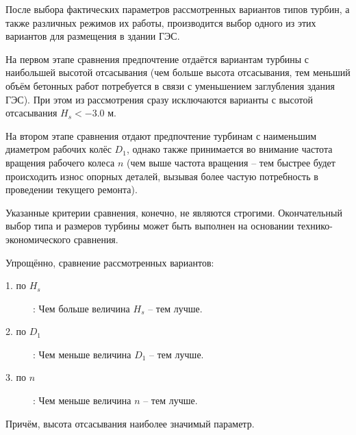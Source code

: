 После выбора фактических параметров рассмотренных вариантов типов турбин, а также различных режимов их работы, производится выбор одного из этих вариантов для размещения в здании ГЭС.

На первом этапе сравнения предпочтение отдаётся вариантам турбины с наибольшей высотой отсасывания (чем больше высота отсасывания, тем меньший объём бетонных работ потребуется в связи с уменьшением заглубления здания ГЭС). При этом из рассмотрения сразу исключаются варианты с высотой отсасывания $H_s < -3.0$ м.

На втором этапе сравнения отдают предпочтение турбинам с наименьшим диаметром рабочих колёс $D_1$, однако также принимается во внимание частота вращения рабочего колеса $n$ (чем выше частота вращения -- тем быстрее будет происходить износ опорных деталей, вызывая более частую потребность в проведении текущего ремонта).

Указанные критерии сравнения, конечно, не являются строгими. Окончательный выбор типа и размеров турбины может быть выполнен на основании технико-экономического сравнения.

\vspace{0.5cm}

Упрощённо, сравнение рассмотренных вариантов:

\begin{description}
\item[1. по $H_s$]: Чем больше величина $H_s$ -- тем лучше. 
\item[2. по $D_1$]: Чем меньше величина $D_1$ -- тем лучше.
\item[3. по $n$]: Чем меньше величина $n$ -- тем лучше.
\end{description}

Причём, высота отсасывания наиболее значимый параметр.






